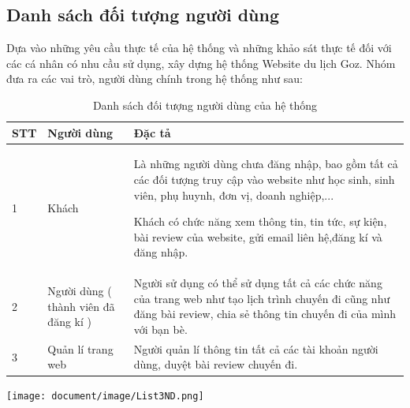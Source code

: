 \subsection{Danh sách đối tượng người dùng}
Dựa vào những yêu cầu thực tế của hệ thống và những khảo sát thực tế đối với các cá nhân có nhu cầu sử dụng, xây dựng hệ thống Website du lịch Goz. Nhóm đưa ra các vai trò, người dùng chính trong hệ thống như sau:
\begin{table}[H]
    \centering
	\begin{tabular}{|p{1cm}|p{4cm}|p{10cm}|}
    \hline
    \textbf{STT}&\textbf{Người dùng}&\textbf{Đặc tả}\\
    \hline
    1&Khách&Là những người dùng chưa đăng nhập, bao gồm tất cả các đối tượng truy cập vào website như học sinh, sinh viên, phụ huynh, đơn vị, doanh nghiệp,...
    
    Khách có chức năng xem thông tin, tin tức, sự kiện, bài review của website, gửi email liên hệ,đăng kí và đăng nhập.\\
    \hline
	2&Người dùng ( thành viên đã đăng kí )& Người sử dụng có thể sử dụng tất cả các chức năng của trang web như tạo lịch trình chuyến đi cũng như đăng bài review, chia sẻ thông tin chuyến đi của mình với bạn bè. \\
	\hline
    3&Quản lí trang web& Người quản lí thông tin tất cả các tài khoản người dùng, duyệt bài review chuyến đi.\\
   
	\hline
\end{tabular}
\caption{Danh sách đối tượng người dùng của hệ thống}
\end{table}
\begin{center}
  \captionsetup{type=figure}
  \texttt{[image: document/image/List3ND.png]}
\end{center}


